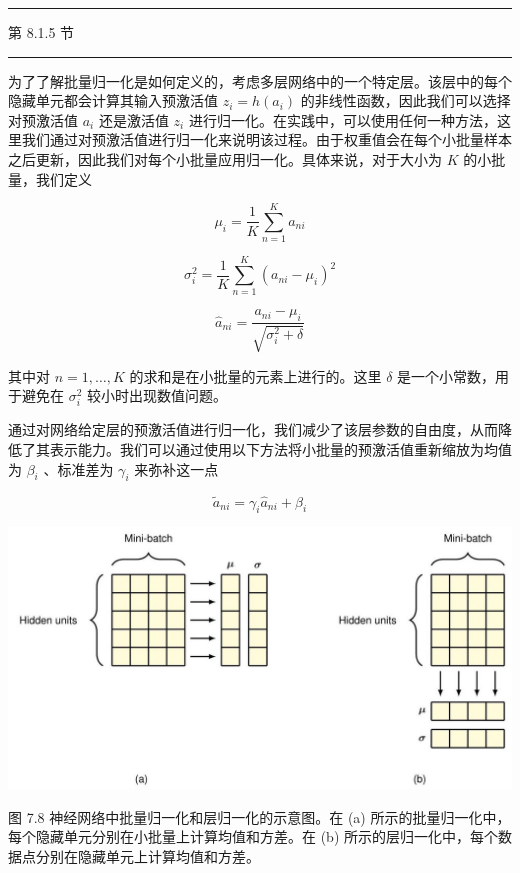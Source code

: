 \documentclass[10pt]{article}
\newcommand{\HRule}{\begin{center}\rule{0.9\linewidth}{0.2mm}\end{center}}
\begin{document}
\HRule

第 8.1.5 节

\HRule

为了了解批量归一化是如何定义的，考虑多层网络中的一个特定层。该层中的每个隐藏单元都会计算其输入预激活值 \({z}_{i} = h\left( {a}_{i}\right)\) 的非线性函数，因此我们可以选择对预激活值 \({a}_{i}\) 还是激活值 \({z}_{i}\) 进行归一化。在实践中，可以使用任何一种方法，这里我们通过对预激活值进行归一化来说明该过程。由于权重值会在每个小批量样本之后更新，因此我们对每个小批量应用归一化。具体来说，对于大小为 \(K\) 的小批量，我们定义

\[
{\mu }_{i} = \frac{1}{K}\mathop{\sum }\limits_{{n = 1}}^{K}{a}_{ni} \tag{7.52}
\]

\[
{\sigma }_{i}^{2} = \frac{1}{K}\mathop{\sum }\limits_{{n = 1}}^{K}{\left( {a}_{ni} - {\mu }_{i}\right) }^{2} \tag{7.53}
\]

\[
{\widehat{a}}_{ni} = \frac{{a}_{ni} - {\mu }_{i}}{\sqrt{{\sigma }_{i}^{2} + \delta }} \tag{7.54}
\]

其中对 \(n = 1,\ldots ,K\) 的求和是在小批量的元素上进行的。这里 \(\delta\) 是一个小常数，用于避免在 \({\sigma }_{i}^{2}\) 较小时出现数值问题。

通过对网络给定层的预激活值进行归一化，我们减少了该层参数的自由度，从而降低了其表示能力。我们可以通过使用以下方法将小批量的预激活值重新缩放为均值为 \({\beta }_{i}\) 、标准差为 \({\gamma }_{i}\) 来弥补这一点

\[
{\widetilde{a}}_{ni} = {\gamma }_{i}{\widehat{a}}_{ni} + {\beta }_{i} \tag{7.55}
\]

\begin{center}
\includegraphics[max width=1.0\textwidth]{images/0194e279-9b28-703a-88f4-c3ac21e2010d_247_237_349_1314_683_0.jpg}
\end{center}
\hspace*{3em} 

图 7.8 神经网络中批量归一化和层归一化的示意图。在 (a) 所示的批量归一化中，每个隐藏单元分别在小批量上计算均值和方差。在 (b) 所示的层归一化中，每个数据点分别在隐藏单元上计算均值和方差。
\end{document}
